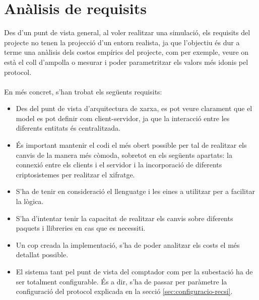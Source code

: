 \newcommand{\java}{Java 8}
\newcommand{\mavenLarge}{Apache Maven 3.6.3}
\newcommand{\maven}{\texttt{maven} }
\newcommand{\ciglib}{\texttt{CigLib} }
\newcommand{\toml}{\texttt{Toml}}
\newcommand{\dto}{\texttt{DTO} }
\newcommand{\factoryDTO}{\texttt{FactorySMSDatagram} }


\section{Anàlisis de requisits}
Des d'un punt de vista general, al voler realitzar una simulació, els requisits del projecte no tenen la projecció d'un entorn realista, ja que l'objectiu és dur a terme una anàlisis dels costos empírics del projecte, com per exemple, veure on està el coll d'ampolla o mesurar i poder parametritzar els valors més idonis pel protocol.
\\
\\
En més concret, s'han trobat els següents requisits:
\begin{itemize}
	\item Des del punt de vista d'arquitectura de xarxa, es pot veure clarament que el model es pot definir com client-servidor, ja que la interacció entre les diferents entitats és centralitzada.
	\item És important mantenir el codi el més obert possible per tal de realitzar els canvis de la manera més còmoda, sobretot en els següents apartats: la connexió entre els clients i el servidor i la incorporació de diferents criptosistemes per realitzar el xifratge.
	\item S'ha de tenir en consideració el llenguatge i les eines a utilitzar per a facilitar la lògica.
	\item S'ha d'intentar tenir la capacitat de realitzar els canvis sobre diferents paquets i llibreries en cas que es necessiti.
	\item Un cop creada la implementació, s'ha de poder analitzar els costs el més detallat possible.
	\item El sistema tant pel punt de vista del comptador com per la subestació ha de ser totalment configurable. És a dir, s'ha de passar per paràmetre la configuració del protocol explicada en la secció \ref{sec:configuracio-recsi}.
\end{itemize}
